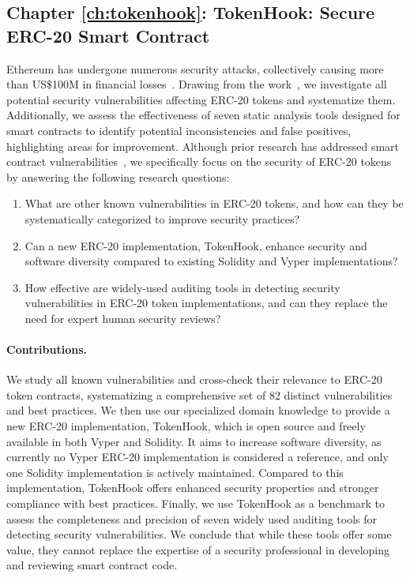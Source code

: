 \subsection*{Chapter \ref{ch:tokenhook}: TokenHook: Secure ERC-20 Smart Contract}
Ethereum has undergone numerous security attacks, collectively causing more than US\$100M in financial losses~\cite{DAO1,PeckShield,PartiyMultiSig,MyEthWallet,ParityFirstHack,ParitySecondHack}. Drawing from the \mwa work~\cite{MultipleWithdrawal}, we investigate all potential security vulnerabilities affecting ERC-20 tokens and systematize them. Additionally, we assess the effectiveness of seven static analysis tools designed for smart contracts to identify potential inconsistencies and false positives, highlighting areas for improvement. Although prior research has addressed smart contract vulnerabilities~\cite{EthSecServ}, we specifically focus on the security of ERC-20 tokens by answering the following research questions:
\begin{enumerate}[label={(RQ6.\arabic*)},leftmargin=*]
	\item What are other known vulnerabilities in ERC-20 tokens, and how can they be systematically categorized to improve security practices?
	\item Can a new ERC-20 implementation, TokenHook, enhance security and software diversity compared to existing Solidity and Vyper implementations?
	\item How effective are widely-used auditing tools in detecting security vulnerabilities in ERC-20 token implementations, and can they replace the need for expert human security reviews?
\end{enumerate}
\paragraph{Contributions.} We study all known vulnerabilities and cross-check their relevance to ERC-20 token contracts, systematizing a comprehensive set of 82 distinct vulnerabilities and best practices. We then use our specialized domain knowledge to provide a new ERC-20 implementation, TokenHook, which is open source and freely available in both Vyper and Solidity. It aims to increase software diversity, as currently no Vyper ERC-20 implementation is considered a reference, and only one Solidity implementation is actively maintained. Compared to this implementation, TokenHook offers enhanced security properties and stronger compliance with best practices. Finally, we use TokenHook as a benchmark to assess the completeness and precision of seven widely used auditing tools for detecting security vulnerabilities. We conclude that while these tools offer some value, they cannot replace the expertise of a security professional in developing and reviewing smart contract code.

